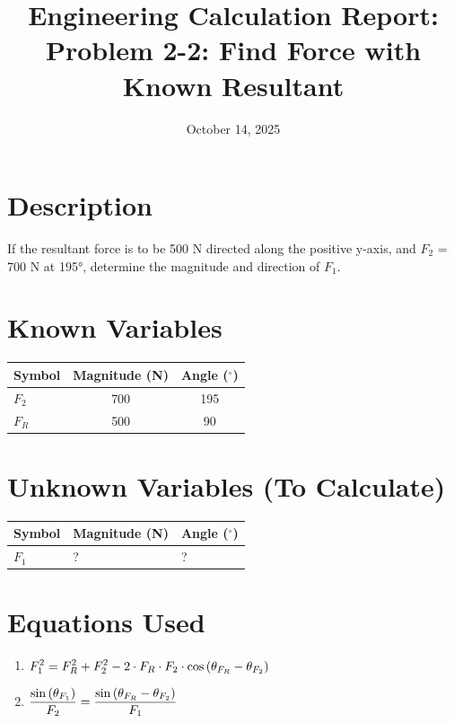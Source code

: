 \documentclass[11pt,a4paper]{article}
\title{Engineering Calculation Report: Problem 2-2: Find Force with Known Resultant}
\date{October 14, 2025}
\begin{document}
\maketitle

\section*{Description}
\noindent
\begin{minipage}{\textwidth}
If the resultant force is to be 500 N directed along the positive y-axis, and $F_{2}$ = 700 N at 195°, determine the magnitude and direction of $F_{1}$.
\end{minipage}
\par

\section{Known Variables}

\begin{longtable}{lSS}
\toprule
Symbol & {Magnitude (N)} & {Angle ($^\circ$)} \\
\midrule
\endhead
$F_{2}$ & 700 & 195 \\
$F_{R}$ & 500 & 90 \\
\bottomrule
\end{longtable}

\section{Unknown Variables (To Calculate)}

\begin{longtable}{lll}
\toprule
Symbol & Magnitude (N) & Angle ($^\circ$) \\
\midrule
\endhead
$F_{1}$ & ? & ? \\
\bottomrule
\end{longtable}

\section{Equations Used}

\begin{enumerate}
\item $\displaystyle\Large F_{1}^{2} = F_{R}^{2} + F_{2}^{2} - 2 \cdot F_R \cdot F_2 \cdot \cos{(\theta_{F_{R}} - \theta_{F_{2}})}$
\item $\displaystyle\Large \frac{\sin{(\theta_{F_{1}})}}{F_2} = \frac{\sin{(\theta_{F_{R}} - \theta_{F_{2}})}}{F_1}$
\end{enumerate}
\end{document}
